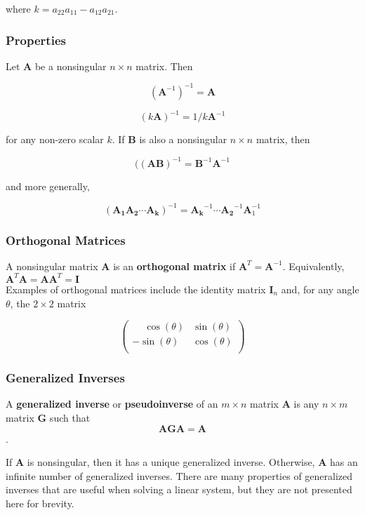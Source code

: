 \documentclass[11pt]{article}
\theoremstyle{definition}
\begin{document}
where $k = a_{22}a_{11} - a_{12}a_{21}$.

\subsubsection{Properties}
Let $\mathbf{A}$ be a nonsingular $n \times n$ matrix.  Then

\[(\mathbf{A}^{-1})^{-1} = \mathbf{A}\]

\[(k\mathbf{A})^{-1} = 1/k\mathbf{A}^{-1}\]

for any non-zero scalar $k$.  If $\mathbf{B}$ is also a nonsingular $n \times n$ matrix, then 

\[((\mathbf{AB})^{-1} = \mathbf{B}^{-1}\mathbf{A}^{-1}\]

and more generally,

\[(\mathbf{A_1 A_2 \cdots A_k})^{-1} = \mathbf{A_k}^{-1}\cdots \mathbf{A_2}^{-1} \mathbf{A}_1^{-1}\]

\subsubsection{Orthogonal Matrices}

A nonsingular matrix $\mathbf{A}$ is an \textbf{orthogonal matrix} if $\mathbf{A}^T = \mathbf{A}^{-1}$.  Equivalently, $\mathbf{A}^T\mathbf{A} = \mathbf{AA}^T = \mathbf{I}$   \\

Examples of orthogonal matrices include the identity matrix $\mathbf{I}_n$ and, for any angle $\theta$, the $2 \times 2$ matrix

\[
 \begin{pmatrix}
    \phantom{-}\cos (\theta) & \sin (\theta) \\
    -\sin (\theta) & \cos (\theta)  \\  
\end{pmatrix}
\]


\subsubsection{Generalized Inverses}
A \textbf{generalized inverse} or \textbf{pseudoinverse} of an $m \times n$ matrix $\mathbf{A}$ is any $n \times m$ matrix $\mathbf{G}$ such that $$\mathbf{AGA} = \mathbf{A}$$.  

If $\mathbf{A}$ is nonsingular, then it has a unique generalized inverse.  Otherwise, $\mathbf{A}$ has an infinite number of generalized inverses.  There are many properties of generalized inverses that are useful when solving a linear system, but they are not presented here for brevity. 
 
\end{document}
